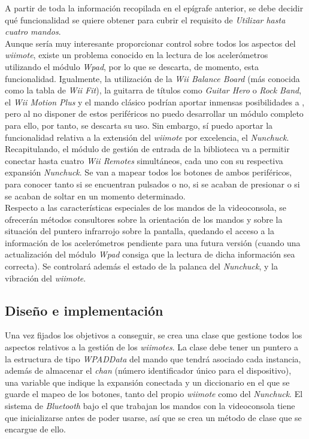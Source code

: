 A partir de toda la información recopilada en el epígrafe anterior, se debe decidir qué funcionalidad se quiere obtener para cubrir el requisito de \emph{Utilizar hasta cuatro mandos}.\\

Aunque sería muy interesante proporcionar control sobre todos los aspectos del \emph{wiimote}, existe un problema conocido en la lectura de los acelerómetros utilizando el módulo \emph{Wpad}, por lo que se descarta, de momento, esta funcionalidad. Igualmente, la utilización de la \emph{Wii Balance Board} (más conocida como la tabla de \emph{Wii Fit}), la guitarra de títulos como \emph{Guitar Hero} o \emph{Rock Band}, el \emph{Wii Motion Plus} y el mando clásico podrían aportar inmensas posibilidades a , pero al no disponer de estos periféricos no puedo desarrollar un módulo completo para ello, por tanto, se descarta su uso. Sin embargo, sí puedo aportar la funcionalidad relativa a la extensión del \emph{wiimote} por excelencia, el \emph{Nunchuck}.\\

Recapitulando, el módulo de gestión de entrada de la biblioteca va a permitir conectar hasta cuatro \emph{Wii Remotes} simultáneos, cada uno con su respectiva expansión \emph{Nunchuck}. Se van a mapear todos los botones de ambos periféricos, para conocer tanto si se encuentran pulsados o no, si se acaban de presionar o si se acaban de soltar en un momento determinado.\\

Respecto a las características especiales de los mandos de la videoconsola, se ofrecerán métodos consultores sobre la orientación de los mandos y sobre la situación del puntero infrarrojo sobre la pantalla, quedando el acceso a la información de los acelerómetros pendiente para una futura versión (cuando una actualización del módulo \emph{Wpad} consiga que la lectura de dicha información sea correcta). Se controlará además el estado de la palanca del \emph{Nunchuck}, y la vibración del \emph{wiimote}.

\subsection{Diseño e implementación}

Una vez fijados los objetivos a conseguir, se crea una clase que gestione todos los aspectos relativos a la gestión de los \emph{wiimotes}. La clase debe tener un puntero a la estructura de tipo \emph{WPADData} del mando que tendrá asociado cada instancia, además de almacenar el \emph{chan} (número identificador único para el dispositivo), una variable que indique la expansión conectada y un diccionario en el que se guarde el mapeo de los botones, tanto del propio \emph{wiimote} como del \emph{Nunchuck}. El sistema de \emph{Bluetooth} bajo el que trabajan los mandos con la videoconsola tiene que inicializarse antes de poder usarse, así que se crea un método de clase que se encargue de ello.\\

